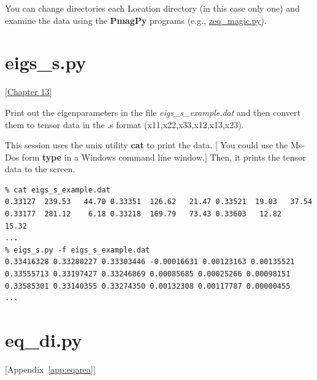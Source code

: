 \documentclass[11pt]{book}
\begin{document}
{{{{You can change directories each Location directory (in this case only one) and examine the data using the {\bf PmagPy} programs (e.g., \href{#zeq_magic.py}{zeq\_magic.py}).   


\section {\bf eigs\_s.py}
\href{http://Webbook2.html#Paleomagnetic_tensors}{ [Chapter 13]}

Print out the eigenparameters  in the file {\it eigs\_s\_example.dat} and then
convert them to tensor data in the .s format (x11,x22,x33,x12,x13,x23).   

This session uses the unix utility {\bf cat} to print the data.  [ You could use the Ms-Dos 
form {\bf type} in a Windows command line window.]    Then, it prints the tensor data to the screen.  

\begin{verbatim}
% cat eigs_s_example.dat 
0.33127  239.53   44.70 0.33351  126.62   21.47 0.33521  19.03   37.54
0.33177  281.12    6.18 0.33218  169.79   73.43 0.33603   12.82   15.32
...
% eigs_s.py -f eigs_s_example.dat
0.33416328 0.33280227 0.33303446 -0.00016631 0.00123163 0.00135521 
0.33555713 0.33197427 0.33246869 0.00085685 0.00025266 0.00098151 
0.33585301 0.33140355 0.33274350 0.00132308 0.00117787 0.00000455 
...
\end{verbatim}





%
\section {\bf eq\_di.py} [Appendix~\ref{app:eqarea}]

}}}}
\end{document}
